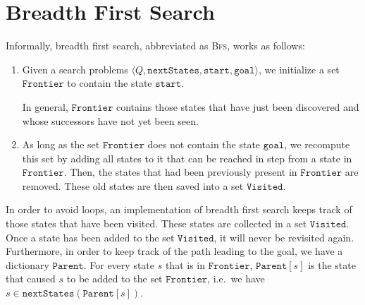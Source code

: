 \section{Breadth First Search}
Informally, breadth first search, abbreviated as \textsc{Bfs}, works as follows:
\begin{enumerate}
\item Given a search problems $\langle Q,\mathtt{nextStates}, \mathtt{start}, \mathtt{goal}\rangle$,  
      we initialize a set $\mathtt{Frontier}$ to contain the state $\mathtt{start}$.

      In general, $\mathtt{Frontier}$ contains those states that have just been discovered and whose successors have not
      yet been seen.
\item As long as the set $\mathtt{Frontier}$ does not contain the state $\mathtt{goal}$, we recompute this set 
      by adding all states to it that can be reached in step from a state in $\mathtt{Frontier}$.
      Then, the states that had been previously present in $\mathtt{Frontier}$ are removed.
      These old states are then saved into a set $\mathtt{Visited}$.
\end{enumerate}
In order to avoid loops, an implementation of breadth first search keeps track of those states that have
been visited.  These states are collected in a set $\mathtt{Visited}$.  Once a state has been added to
the set $\mathtt{Visited}$,  it will never be revisited again. 
Furthermore, in order to keep track of the path leading to the goal, we have a dictionary
$\mathtt{Parent}$.  For every state $s$ that is in $\mathtt{Frontier}$, $\mathtt{Parent}[s]$ is the state that
caused $s$ to be added to the set $\mathtt{Frontier}$, i.e.~we have
\\[0.2cm]
\hspace*{1.3cm}
$s \in \mathtt{nextStates}(\mathtt{Parent}[s])$.


